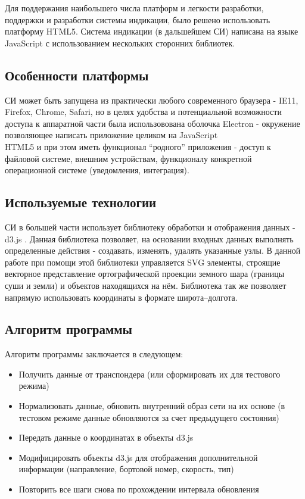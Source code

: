\documentclass[a4paper,12pt]{report} %
\begin{document}
Для поддержания наибольшего числа платформ и легкости разработки, поддержки и
разработки системы индикации, было решено использовать платформу HTML5. Система
индикации (в дальшейшем СИ) написана на языке JavaScript с использованием
нескольких сторонних библиотек.

\subsection{Особенности платформы}

СИ может быть запущена из практически любого современного браузера - IE11,
Firefox, Chrome, Safari, но в целях удобства и потенциальной возможности доступа
к аппаратной части была использовована оболочка Electron\cite{electron} - окружение позволяющее
написать приложение целиком на JavaScript\\HTML5 и при этом иметь функционал
``родного'' приложения - доступ к файловой системе, внешним устройствам,
функционалу конкретной операционной системе (уведомления, интеграция).

\subsection{Используемые технологии}

СИ в большей части использует библиотеку обработки и отображения данных - d3.js \cite{d3js}.
Данная библиотека позволяет, на основании входных данных выполнять определенные
действия - создавать, изменять, удалять указанные узлы. В данной работе при
помощи этой библиотеки управляется SVG элементы, строящие векторное
представление ортографической проекции земного шара (границы суши и земли) и
объектов находящихся на нём. Библиотека так же позволяет напрямую использовать
координаты в формате широта--долгота.

\subsection{Алгоритм программы}

Алгоритм программы заключается в следующем:
\begin{itemize}
\item Получить данные от транспондера (или сформировать их для тестового режима)
\item Нормализовать данные, обновить внутренний образ сети на их основе (в
  тестовом режиме данные обновляются за счет предыдущего состояния)
\item Передать данные о координатах в объекты d3.js
\item Модифицировать объекты d3.js для отображения дополнительной информации
  (направление, бортовой номер, скорость, тип)
\item Повторить все шаги снова по прохождении интервала обновления
\end{itemize}
\newpage
\end{document}
